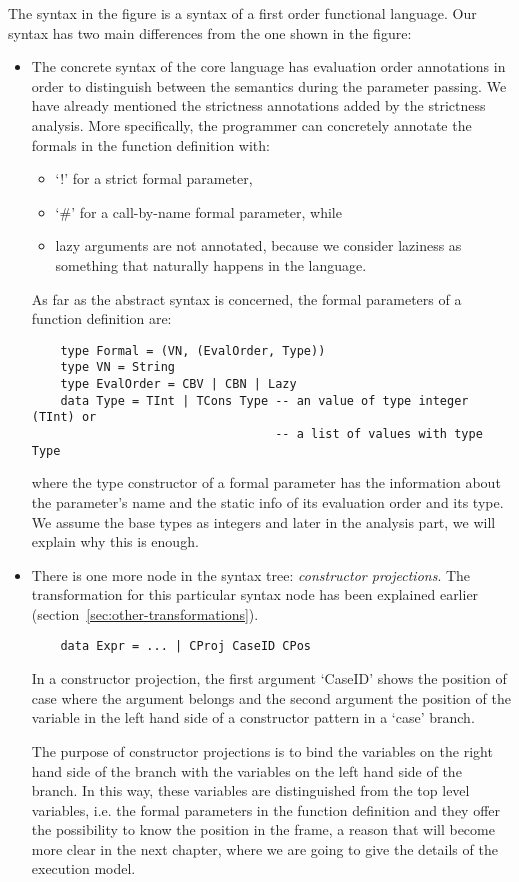 \documentclass[diploma]{softlab-thesis}
\begin{document}
The syntax in the figure is a syntax of a first order functional language. Our syntax has two main 
differences from the one shown in the figure:
\begin{itemize}
  \item The concrete syntax of the core language has evaluation order annotations in order to 
  distinguish between the semantics during the parameter passing. We have already mentioned the 
  strictness annotations added by the strictness analysis. 
  More specifically, the programmer can concretely annotate the formals in the function definition with:
    \begin{itemize}
      \item {`!' for a strict formal parameter,}
      \item { `\#' for a call-by-name formal parameter, while}
      \item {lazy arguments are not annotated, because we consider laziness as something that naturally happens 
      in the language.}
    \end{itemize}
  
  As far as the abstract syntax is concerned, the formal parameters of a function definition are:
  \begin{verbatim}
    type Formal = (VN, (EvalOrder, Type))
    type VN = String 
    type EvalOrder = CBV | CBN | Lazy 
    data Type = TInt | TCons Type -- an value of type integer (TInt) or 
                                  -- a list of values with type Type
  \end{verbatim}
  where the type constructor of a formal parameter has the information about the parameter's name and 
  the static info of its evaluation order and its type. We assume the base types as integers and later in 
  the analysis part, we will explain why this is enough.

  \item There is one more node in the syntax tree: \textit{constructor projections}. The transformation for this 
  particular syntax node has been explained earlier (section~\ref{sec:other-transformations}). 
  \begin{verbatim}
    data Expr = ... | CProj CaseID CPos 
  \end{verbatim}
  In a constructor projection, the first argument `CaseID' shows the position of case where the argument belongs
  and the second argument the position of the variable in the left hand side of a constructor pattern in a `case' branch.
  
  The purpose of constructor projections is to bind the variables on the right hand side of the branch with the variables 
  on the left hand side of the branch. In this way, these variables are distinguished from the top level variables, i.e.
  the formal parameters in the function definition and they offer the possibility to know the position in the frame, 
  a reason that will become more clear in the next chapter, where we are going to give the details of the 
  execution model.
\end{itemize}
\end{document}
